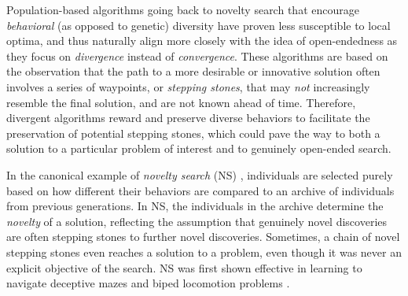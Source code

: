 \documentclass{article}
\newcommand{\todo}[1]{\comments{\textcolor{red}{[TODO: #1]}}}
\newcommand{\ks}[1]{\comments{\textcolor{purple}{[Ken: #1]}}}
\newcommand{\rw}[1]{\comments{\textcolor{blue}{[Rui: #1]}}}
\newcommand{\comments}[1]{#1}
\begin{document}
Population-based algorithms going back to novelty search \cite{lehman} that encourage \emph{behavioral} (as opposed to genetic) diversity \cite{cully:nature15, mouret2015illuminating,pugh:frontiers16, huizinga2016does, nguyen2016innovative, Joost:arxiv18} have proven less susceptible to local optima, and thus naturally align more closely with the idea of open-endedness as they focus on \emph{divergence} instead of \emph{convergence}. These algorithms are based on the observation that the path to a more desirable or innovative solution often involves a series of waypoints, or \emph{stepping stones}, that may \emph{not} increasingly resemble the final solution, and are not known ahead of time. Therefore, divergent algorithms reward and preserve diverse behaviors to facilitate the preservation of potential stepping stones, which could pave the way to both a solution to a particular problem of interest and to genuinely open-ended search. 

In the canonical example of \emph{novelty search} (NS)
\cite{lehman}, individuals are selected purely based on how different their behaviors are compared to an archive of individuals from previous generations. In NS, the individuals in the archive determine the \textit{novelty} of a solution, reflecting the assumption that genuinely novel discoveries are often stepping stones to further novel discoveries.  Sometimes, a chain of novel stepping stones even reaches a solution to a problem, even though it was never an explicit objective of the search.  NS was first shown effective in learning to navigate deceptive mazes and biped locomotion problems  \cite{lehman}. 
\end{document}
